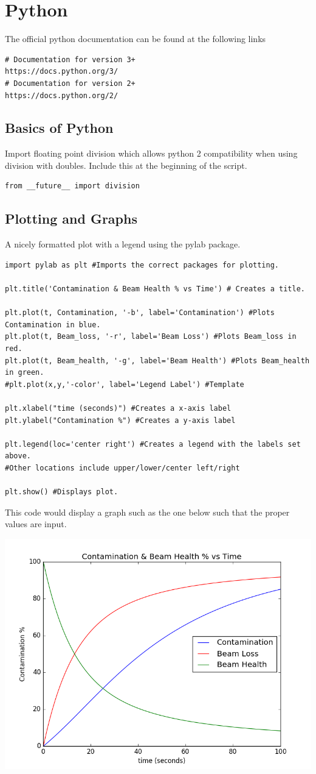 \chapter{Python}
\thispagestyle{fancy}
\lstset{language=Python}

The official python documentation can be found at the following links
\begin{lstlisting}
# Documentation for version 3+
https://docs.python.org/3/
# Documentation for version 2+
https://docs.python.org/2/
\end{lstlisting}

\section{Basics of Python}

Import floating point division which allows python 2 compatibility when using division with doubles. Include this at the beginning of the script.
\begin{lstlisting}
from __future__ import division
\end{lstlisting}



\section{Plotting and Graphs}

A nicely formatted plot with a legend using the pylab package.
\begin{lstlisting}
import pylab as plt #Imports the correct packages for plotting.

plt.title('Contamination & Beam Health % vs Time') # Creates a title.

plt.plot(t, Contamination, '-b', label='Contamination') #Plots Contamination in blue.
plt.plot(t, Beam_loss, '-r', label='Beam Loss') #Plots Beam_loss in red.
plt.plot(t, Beam_health, '-g', label='Beam Health') #Plots Beam_health in green.
#plt.plot(x,y,'-color', label='Legend Label') #Template

plt.xlabel("time (seconds)") #Creates a x-axis label
plt.ylabel("Contamination %") #Creates a y-axis label

plt.legend(loc='center right') #Creates a legend with the labels set above.
#Other locations include upper/lower/center left/right

plt.show() #Displays plot.
\end{lstlisting}
This code would display a graph such as the one below such that the proper values are input.

\includegraphics[width=0.5\linewidth]{./Images/Figures/figure_1-4}


